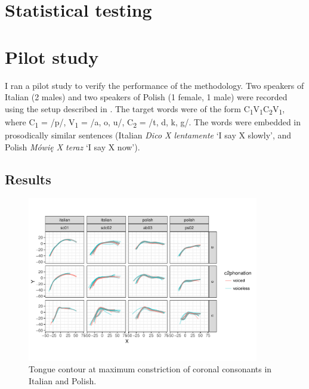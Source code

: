 \documentclass[11pt,A4paper,]{article}
\begin{document}
\section{Statistical testing}\label{statistical-testing}

\section{Pilot study}\label{pilot-study}

I ran a pilot study to verify the performance of the methodology. Two
speakers of Italian (2 males) and two speakers of Polish (1 female, 1
male) were recorded using the setup described in . The
target words were of the form
C\textsubscript{1}V\textsubscript{1}C\textsubscript{2}V\textsubscript{1},
where C\textsubscript{1} = /p/, V\textsubscript{1} = /a, o, u/,
C\textsubscript{2} = /t, d, k, g/. The words were embedded in
prosodically similar sentences (Italian \emph{Dico X lentamente} `I say
X slowly', and Polish \emph{Mówię X teraz} `I say X now').

\subsection{Results}\label{results}

\begin{figure}[htbp]
\centering
\includegraphics[width=0.90000\textwidth]{../graphics/coronal.pdf}
\caption{Tongue contour at maximum constriction of coronal consonants in
Italian and Polish.\label{f:coronal}}
\end{figure}
\end{document}

